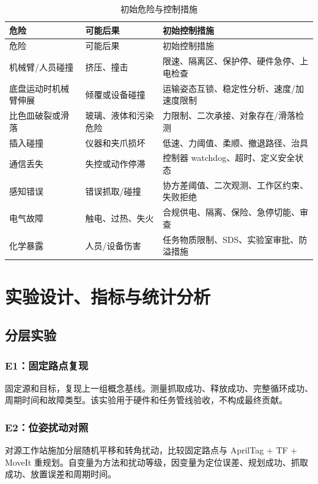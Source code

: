 \documentclass[UTF8,12pt,oneside]{ctexrep}
\begin{document}
\begin{longtable}{L{3.2cm}L{4.5cm}L{6.8cm}}
\caption{初始危险与控制措施}\\
\toprule
危险 & 可能后果 & 初始控制措施 \\
\midrule
\endfirsthead
\toprule
危险 & 可能后果 & 初始控制措施 \\
\midrule
\endhead
机械臂/人员碰撞 & 挤压、撞击 & 限速、隔离区、保护停、硬件急停、上电检查 \\
底盘运动时机械臂伸展 & 倾覆或设备碰撞 & 运输姿态互锁、稳定性分析、速度/加速度限制 \\
比色皿破裂或滑落 & 玻璃、液体和污染危险 & 力限制、二次承接、对象存在/滑落检测 \\
插入碰撞 & 仪器和夹爪损坏 & 低速、力阈值、柔顺、撤退路径、治具 \\
通信丢失 & 失控或动作停滞 & 控制器 watchdog、超时、定义安全状态 \\
感知错误 & 错误抓取/碰撞 & 协方差阈值、二次观测、工作区约束、失败拒绝 \\
电气故障 & 触电、过热、失火 & 合规供电、隔离、保险、急停切能、审查 \\
化学暴露 & 人员/设备伤害 & 任务物质限制、SDS、实验室审批、防溢措施 \\
\bottomrule
\end{longtable}



\chapter{实验设计、指标与统计分析}

\section{分层实验}

\subsection{E1：固定路点复现}

固定源和目标，复现上一组概念基线。测量抓取成功、释放成功、完整循环成功、周期时间和故障类型。该实验用于硬件和任务管线验收，不构成最终贡献。

\subsection{E2：位姿扰动对照}

对源工作站施加分层随机平移和转角扰动，比较固定路点与 AprilTag + TF + MoveIt 重规划。自变量为方法和扰动等级，因变量为定位误差、规划成功、抓取成功、放置误差和周期时间。
\end{document}
